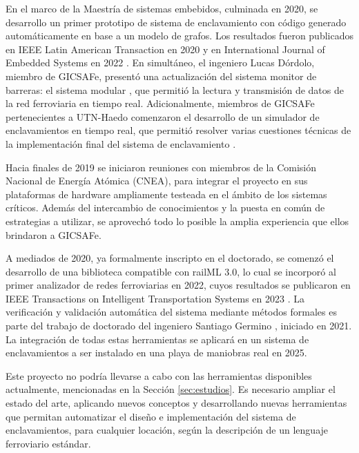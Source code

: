     En el marco de la Maestría de sistemas embebidos, culminada en 2020, se desarrollo un primer prototipo de sistema de enclavamiento con código generado automáticamente en base a un modelo de grafos. Los resultados fueron publicados en IEEE Latin American Transaction en 2020 \cite{Paper_204} y en International Journal of Embedded Systems en 2022 \cite{Paper_206}. En simultáneo, el ingeniero Lucas Dórdolo, miembro de GICSAFe, presentó una actualización del sistema monitor de barreras: el sistema modular \cite{Paper_209}, que permitió la lectura y transmisión de datos de la red ferroviaria en tiempo real. Adicionalmente, miembros de GICSAFe pertenecientes a UTN-Haedo comenzaron el desarrollo de un simulador de enclavamientos en tiempo real, que permitió resolver varias cuestiones técnicas de la implementación final del sistema de enclavamiento \cite{Paper_205}.

    Hacia finales de 2019 se iniciaron reuniones con miembros de la Comisión Nacional de Energía Atómica (CNEA), para integrar el proyecto en sus plataformas de hardware ampliamente testeada en el ámbito de los sistemas críticos. Además del intercambio de conocimientos y la puesta en común de estrategias a utilizar, se aprovechó todo lo posible la amplia experiencia que ellos brindaron a GICSAFe.
    
    A mediados de 2020, ya formalmente inscripto en el doctorado, se comenzó el desarrollo de una biblioteca compatible con railML 3.0, lo cual se incorporó al primer analizador de redes ferroviarias en 2022, cuyos resultados se publicaron en IEEE Transactions on Intelligent Transportation Systems en 2023 \cite{Paper_208}. La verificación y validación automática del sistema mediante métodos formales es parte del trabajo de doctorado del ingeniero Santiago Germino \cite{Paper_207}, iniciado en 2021. La integración de todas estas herramientas se aplicará en un sistema de enclavamientos a ser instalado en una playa de maniobras real en 2025. 
    
    Este proyecto no podría llevarse a cabo con las herramientas disponibles actualmente, mencionadas en la Sección \ref{sec:estudios}. Es necesario ampliar el estado del arte, aplicando nuevos conceptos y desarrollando nuevas herramientas que permitan automatizar el diseño e implementación del sistema de enclavamientos, para cualquier locación, según la descripción de un lenguaje ferroviario estándar.
    
    
    
    
    
    
    
    
    
    